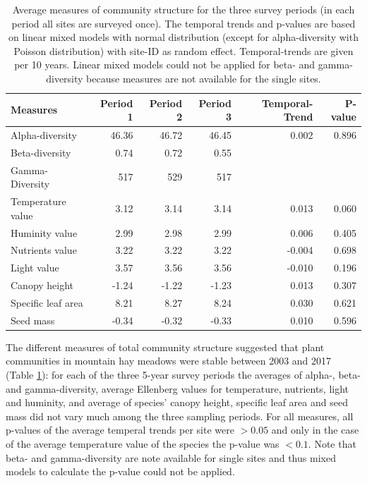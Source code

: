 \documentclass[fleqn,10pt,lineno]{wlpeerj} %
\theoremstyle{definition}
\theoremstyle{definition}
\theoremstyle{definition}
\theoremstyle{remark}
\begin{document}
\begin{table}[ht]
\centering
\begin{tabular}{lrrrrr}
  \hline
Measures & Period 1 & Period 2 & Period 3 & Temporal-Trend & P-value \\ 
  \hline
Alpha-diversity & 46.36 & 46.72 & 46.45 & 0.002 & 0.896 \\ 
  Beta-diversity & 0.74 & 0.72 & 0.55 &  &  \\ 
  Gamma-Diversity & 517 & 529 & 517 &  &  \\ 
  Temperature value & 3.12 & 3.14 & 3.14 & 0.013 & 0.060 \\ 
  Huminity value & 2.99 & 2.98 & 2.99 & 0.006 & 0.405 \\ 
  Nutrients value & 3.22 & 3.22 & 3.22 & -0.004 & 0.698 \\ 
  Light value & 3.57 & 3.56 & 3.56 & -0.010 & 0.196 \\ 
  Canopy height & -1.24 & -1.22 & -1.23 & 0.013 & 0.307 \\ 
  Specific leaf area & 8.21 & 8.27 & 8.24 & 0.030 & 0.621 \\ 
  Seed mass & -0.34 & -0.32 & -0.33 & 0.010 & 0.596 \\ 
   \hline
\end{tabular}
\caption{Average measures of community structure for the three survey periods (in each period all sites are surveyed once). The temporal trends and p-values are based on linear mixed models with normal distribution (except for alpha-diversity with Poisson distribution) with site-ID as random effect. Temporal-trends are given per 10 years. Linear mixed models could not be applied for beta- and gamma-diversity because measures are not available for the single sites.} 
\label{temporaltrends}
\end{table}

The different measures of total community structure suggested that plant
communities in mountain hay meadows were stable between 2003 and 2017
(Table \ref{temporaltrends}): for each of the three 5-year survey
periods the averages of alpha-, beta- and gamma-diversity, average
Ellenberg values for temperature, nutrients, light and huminity, and
average of species' canopy height, specific leaf area and seed mass did
not vary much among the three sampling periods. For all measures, all
p-values of the average temperal trends per site were \(>0.05\) and only
in the case of the average temperature value of the species the p-value
was \(<0.1\). Note that beta- and gamma-diversity are note available for
single sites and thus mixed models to calculate the p-value could not be
applied.
\end{document}
